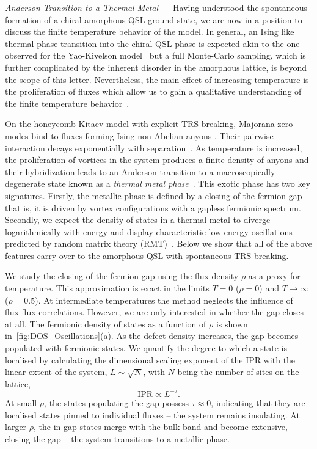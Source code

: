 \documentclass[%
 reprint,
superscriptaddress,
 amsmath,amssymb,
aps,
]{revtex4-2}
\begin{document}
{\it Anderson Transition to a Thermal Metal ---} 
Having understood the spontaneous formation of a chiral amorphous QSL ground state, we are now in a position to discuss the finite temperature behavior of the model. In general, an Ising like thermal phase transition into the chiral QSL phase is expected akin to the one observed for the Yao-Kivelson model~\cite{nasu2015thermodynamics} but a full Monte-Carlo sampling, which is further complicated by the inherent disorder in the amorphous lattice, is beyond the scope of this letter. Nevertheless, the main effect of increasing temperature is the proliferation of fluxes which allow us to gain a qualitative understanding of the finite temperature behavior~\cite{Nasu_Thermal_2015}.


On the honeycomb Kitaev model with explicit TRS breaking, Majorana zero modes bind to fluxes forming Ising non-Abelian anyons \cite{Beenakker2013}. Their pairwise interaction decays exponentially with separation~\cite{Laumann2012,Lahtinen_2011,lahtinenTopologicalLiquidNucleation2012}. As temperature is increased, the proliferation of vortices in the system produces a finite density of anyons and their hybridization leads to an Anderson transition to a macroscopically degenerate state known as a \emph{thermal metal phase}~\cite{Laumann2012, selfThermallyInducedMetallic2019, Chalker_thermal_2001}. This exotic phase has two key signatures. Firstly, the metallic phase is defined by a closing of the fermion gap -- that is, it is driven by vortex configurations with a gapless fermionic spectrum. Secondly, we expect the density of states in a thermal metal to diverge logarithmically with energy and display characteristic low energy oscillations predicted by random matrix theory (RMT)~\cite{bocquet_disordered_2000, selfThermallyInducedMetallic2019}. Below we show that all of the above features carry over to the amorphous QSL with spontaneous TRS breaking. 

\par
We study the closing of the fermion gap using the flux density $\rho$ as a proxy for temperature. This approximation is exact in the limits $T = 0$ ($\rho = 0$) and $T \to \infty$ ($\rho = 0.5$). At intermediate temperatures the method neglects the influence of flux-flux correlations. However, we are only interested in whether the gap closes at all. The fermionic density of states as a function of $\rho$ is shown in~\cref{fig:DOS_Oscillations}(a). As the defect density increases, the gap becomes populated with fermionic states. We quantify the degree to which a state is localised by calculating the dimensional scaling exponent of the IPR with the linear extent of the system, $L\sim\sqrt{N}$, with $N$ being the number of sites on the lattice,
\begin{equation}
    \mathrm{IPR} \propto L^{-\tau}.
\end{equation}
At small $\rho$, the states populating the gap possess $\tau\approx0$, indicating that they are localised states pinned to individual fluxes -- the system remains insulating. At larger $\rho$, the in-gap states merge with the bulk band and become extensive, closing the gap -- the system transitions to a metallic phase.
\end{document}
